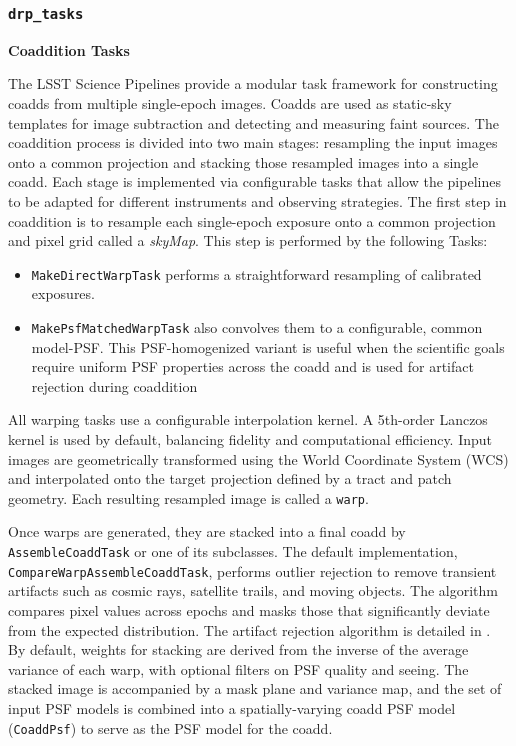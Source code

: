 \subsubsection{\texttt{drp\_tasks}}

\textbf{Coaddition Tasks}
\label{sec:coaddition-tasks}

The LSST Science Pipelines provide a modular task framework for constructing coadds from multiple single-epoch images.
Coadds are used as static-sky templates for image subtraction and detecting and measuring faint sources.
The coaddition process is divided into two main stages: resampling the input images onto a common projection and stacking those resampled images into a single coadd.
Each stage is implemented via configurable tasks that allow the pipelines to be adapted for different instruments and observing strategies.
The first step in coaddition is to resample each single-epoch exposure onto a common projection and pixel grid called a \textit{skyMap}.
This step is performed by the following Tasks:
\begin{itemize}
\item \texttt{MakeDirectWarpTask} performs a straightforward resampling of calibrated exposures.
 \item \texttt{MakePsfMatchedWarpTask} also convolves them to a configurable, common model-PSF.
 This PSF-homogenized variant is useful when the scientific goals require uniform PSF properties across the coadd and is used for artifact rejection during coaddition
 \end{itemize}

All warping tasks use a configurable interpolation kernel. A 5th-order Lanczos kernel is used by default, balancing fidelity and computational efficiency.
Input images are geometrically transformed using the World Coordinate System (WCS) and interpolated onto the target projection defined by a tract and patch geometry.
Each resulting resampled image is called a \texttt{warp}.

Once warps are generated, they are stacked into a final coadd by \texttt{AssembleCoaddTask} or one of its subclasses.
The default implementation, \texttt{CompareWarpAssembleCoaddTask}, performs outlier rejection to remove transient artifacts such as cosmic rays, satellite trails, and moving objects.
The algorithm compares pixel values across epochs and masks those that significantly deviate from the expected distribution.
The artifact rejection algorithm is detailed in \citet{DMTN-080}.
By default, weights for stacking are derived from the inverse of the average variance of each warp, with optional filters on PSF quality and seeing.
The stacked image is accompanied by a mask plane and variance map, and the set of input PSF models is combined into a spatially-varying coadd PSF model (\texttt{CoaddPsf}) to serve as the PSF model for the coadd.

